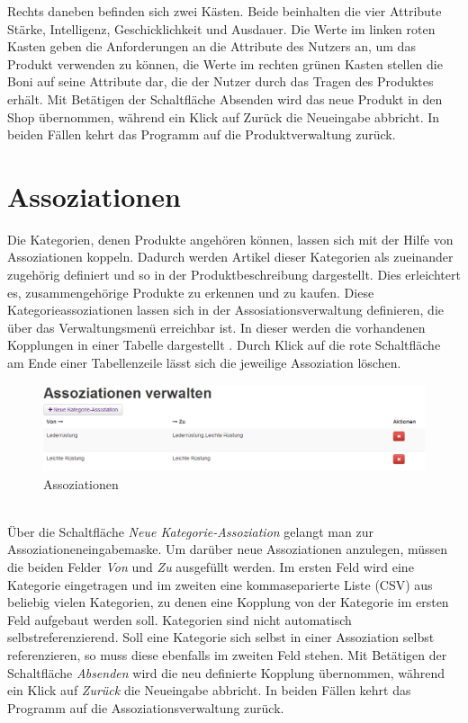 Rechts daneben befinden sich zwei Kästen. Beide beinhalten die vier Attribute Stärke, Intelligenz, Geschicklichkeit und Ausdauer. Die Werte im linken roten Kasten geben die Anforderungen an die Attribute des Nutzers an, um das Produkt verwenden zu können, die Werte im rechten grünen Kasten stellen die Boni auf seine Attribute dar, die der Nutzer durch das Tragen des Produktes erhält.
Mit Betätigen der Schaltfläche Absenden wird das neue Produkt in den Shop übernommen, während ein Klick auf Zurück die Neueingabe abbricht. In beiden Fällen kehrt das Programm auf die Produktverwaltung zurück.


\section{Assoziationen}
\label{chp:Assoziationen}
Die Kategorien, denen Produkte angehören können, lassen sich mit der Hilfe von Assoziationen koppeln. Dadurch werden Artikel dieser Kategorien als zueinander zu\-ge\-hö\-rig definiert und so in der Produktbeschreibung  dargestellt. Dies erleichtert es, zusammengehörige Produkte zu erkennen und zu kaufen. Diese Kategorieassoziationen lassen sich in der Assosiationsverwaltung definieren, die über das Verwaltungsmenü erreichbar ist. In dieser werden die vorhandenen Kopplungen in einer Tabelle dargestellt . Durch Klick auf die rote Schaltfläche am Ende einer Tabellenzeile lässt sich die jeweilige Assoziation löschen. \\

\begin{figure}[h!]
  \centering
  \includegraphics[width=\textwidth]{img/Assoziationen.png}
  \caption{Assoziationen}
  \label{fig:Assoziationen}
\end{figure}
\text{}\vspace*{-1em}\\
Über die Schaltfläche \textit{Neue Kategorie-Assoziation} gelangt man zur Asso\-zia\-tionen\-ein\-ga\-be\-mas\-ke. Um darüber neue Assoziationen anzulegen, müssen die beiden Felder \textit{Von} und \textit{Zu} ausgefüllt werden. Im ersten Feld wird eine Kategorie eingetragen und im zweiten eine kommaseparierte Liste (CSV) aus beliebig vielen Kategorien, zu denen eine Kopplung von der Kategorie im ersten Feld aufgebaut werden soll. Kategorien sind nicht automatisch selbstreferenzierend. Soll eine Kategorie sich selbst in einer Assoziation selbst referenzieren, so muss diese ebenfalls im zweiten Feld stehen. Mit Betätigen der Schaltfläche \textit{Absenden} wird die neu definierte Kopplung übernommen, während ein Klick auf \textit{Zurück} die Neueingabe abbricht. In beiden Fällen kehrt das Programm auf die Assoziationsverwaltung zurück.


